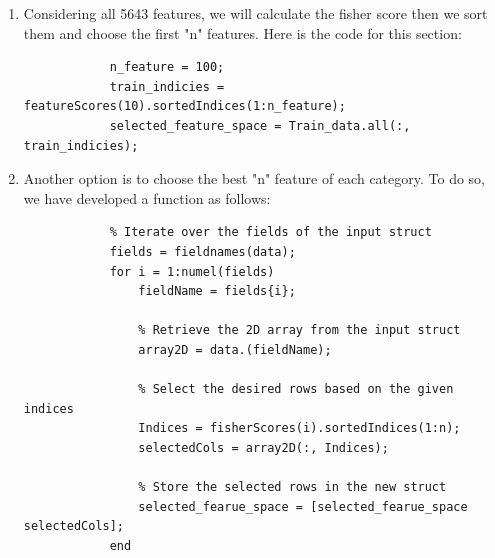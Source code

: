 \documentclass[]{article}
\begin{document}
	\begin{enumerate}
		\item Considering all 5643 features, we will calculate the fisher score then we sort them and choose the first "n" features. Here is the code for this section:
		\begin{lstlisting}
			n_feature = 100;
			train_indicies = featureScores(10).sortedIndices(1:n_feature);
			selected_feature_space = Train_data.all(:, train_indicies);
		\end{lstlisting}
	
		\item Another option is to choose the best "n" feature of each category. To do so, we have developed a function as follows:
		\begin{lstlisting}
			% Iterate over the fields of the input struct
			fields = fieldnames(data);
			for i = 1:numel(fields)
				fieldName = fields{i};
				
				% Retrieve the 2D array from the input struct
				array2D = data.(fieldName);
				
				% Select the desired rows based on the given indices
				Indices = fisherScores(i).sortedIndices(1:n);
				selectedCols = array2D(:, Indices);
				
				% Store the selected rows in the new struct
				selected_fearue_space = [selected_fearue_space selectedCols];
			end
		\end{lstlisting}
	\end{enumerate}
\end{document}
